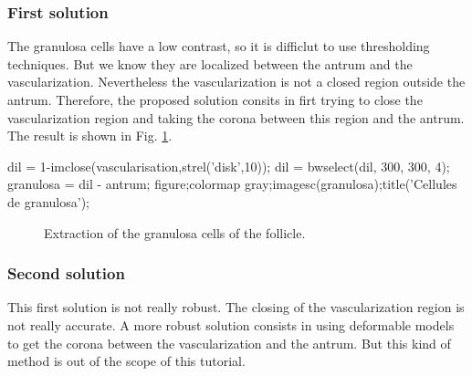 \subsubsection{First solution}
The granulosa cells have a low contrast, so it is difficlut to use thresholding techniques. But we know they are localized between the antrum and the vascularization. Nevertheless the vascularization is not a closed region outside the antrum. Therefore, the proposed solution consits in firt trying to close the vascularization region and taking the corona between this region and the antrum. The result is shown in Fig. \ref{fig:segfollicle:matlab:granulosa}.

\begin{matlab}
dil = 1-imclose(vascularisation,strel('disk',10));
dil = bwselect(dil, 300, 300, 4);
granulosa = dil - antrum;
figure;colormap gray;imagesc(granulosa);title('Cellules de granulosa');
\end{matlab}

\begin{figure}[htbp]
\centering
 \hspace{.1\linewidth}
 \caption{Extraction of the granulosa cells of the follicle.}
 \label{fig:segfollicle:matlab:granulosa}
\end{figure}

\subsubsection{Second solution}
This first solution is not really robust. The closing of the vascularization region is not really accurate. A more robust solution consists in using deformable models to get the corona between the vascularization and the antrum. But this kind of method is out of the scope of this tutorial.

